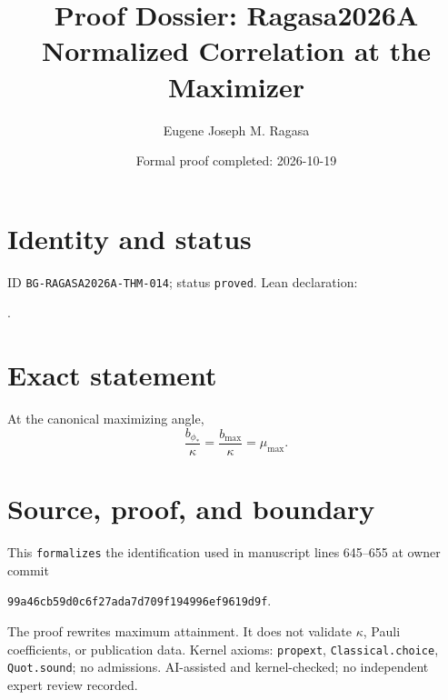 \documentclass[11pt]{article}
\title{Proof Dossier: Ragasa2026A Normalized Correlation at the Maximizer}\author{Eugene Joseph M. Ragasa}\date{Formal proof completed: 2026-10-19}
\begin{document}
\maketitle
\section{Identity and status}
ID \texttt{BG-RAGASA2026A-THM-014}; status \texttt{proved}. Lean declaration:
\par{}.
\section{Exact statement}
At the canonical maximizing angle,
\[\frac{b_{\phi_*}}{\kappa}=\frac{b_{\max}}{\kappa}=\mu_{\max}.\]
\section{Source, proof, and boundary}
This \texttt{formalizes} the identification used in manuscript lines 645--655 at owner
commit
\begin{center}\small\texttt{99a46cb59d0c6f27ada7d709f194996ef9619d9f}.\end{center}
The proof rewrites maximum attainment. It does not validate $\kappa$, Pauli coefficients,
or publication data. Kernel axioms: \texttt{propext}, \texttt{Classical.choice},
\texttt{Quot.sound}; no admissions. AI-assisted and kernel-checked; no independent expert
review recorded.
\end{document}
